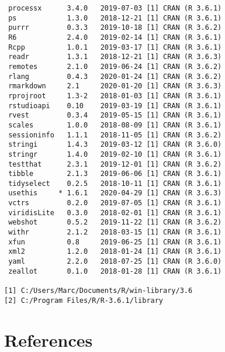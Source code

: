 \documentclass [11pt, proquest] {uwthesis}[2015/03/03]
\begin{document}
\begin{verbatim}
 processx      3.4.0   2019-07-03 [1] CRAN (R 3.6.1)                       
 ps            1.3.0   2018-12-21 [1] CRAN (R 3.6.1)                       
 purrr         0.3.3   2019-10-18 [1] CRAN (R 3.6.2)                       
 R6            2.4.0   2019-02-14 [1] CRAN (R 3.6.1)                       
 Rcpp          1.0.1   2019-03-17 [1] CRAN (R 3.6.1)                       
 readr         1.3.1   2018-12-21 [1] CRAN (R 3.6.3)                       
 remotes       2.1.0   2019-06-24 [1] CRAN (R 3.6.2)                       
 rlang         0.4.3   2020-01-24 [1] CRAN (R 3.6.2)                       
 rmarkdown     2.1     2020-01-20 [1] CRAN (R 3.6.3)                       
 rprojroot     1.3-2   2018-01-03 [1] CRAN (R 3.6.1)                       
 rstudioapi    0.10    2019-03-19 [1] CRAN (R 3.6.1)                       
 rvest         0.3.4   2019-05-15 [1] CRAN (R 3.6.1)                       
 scales        1.0.0   2018-08-09 [1] CRAN (R 3.6.1)                       
 sessioninfo   1.1.1   2018-11-05 [1] CRAN (R 3.6.2)                       
 stringi       1.4.3   2019-03-12 [1] CRAN (R 3.6.0)                       
 stringr       1.4.0   2019-02-10 [1] CRAN (R 3.6.1)                       
 testthat      2.3.1   2019-12-01 [1] CRAN (R 3.6.2)                       
 tibble        2.1.3   2019-06-06 [1] CRAN (R 3.6.1)                       
 tidyselect    0.2.5   2018-10-11 [1] CRAN (R 3.6.1)                       
 usethis     * 1.6.1   2020-04-29 [1] CRAN (R 3.6.3)                       
 vctrs         0.2.0   2019-07-05 [1] CRAN (R 3.6.1)                       
 viridisLite   0.3.0   2018-02-01 [1] CRAN (R 3.6.1)                       
 webshot       0.5.2   2019-11-22 [1] CRAN (R 3.6.2)                       
 withr         2.1.2   2018-03-15 [1] CRAN (R 3.6.1)                       
 xfun          0.8     2019-06-25 [1] CRAN (R 3.6.1)                       
 xml2          1.2.0   2018-01-24 [1] CRAN (R 3.6.1)                       
 yaml          2.2.0   2018-07-25 [1] CRAN (R 3.6.0)                       
 zeallot       0.1.0   2018-01-28 [1] CRAN (R 3.6.1)                       

[1] C:/Users/Marc/Documents/R/win-library/3.6
[2] C:/Program Files/R/R-3.6.1/library
\end{verbatim}
\backmatter

\chapter*{References}\label{references}
\end{document}
